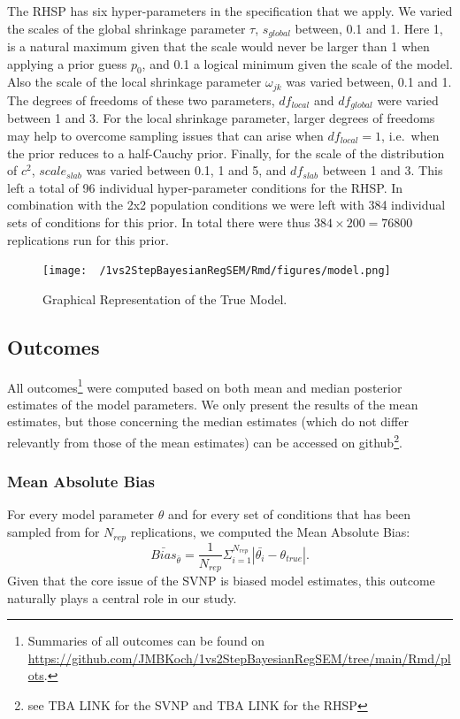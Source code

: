 \documentclass[
  man, donotrepeattitle,floatsintext]{apa6}
\begin{document}
The RHSP has six hyper-parameters in the specification that we apply. We varied the scales of the global shrinkage parameter \(\tau\), \(s_{global}\) between, 0.1 and 1. Here 1, is a natural maximum given that the scale would never be larger than 1 when applying a prior guess \(p_0\), and 0.1 a logical minimum given the scale of the model. Also the scale of the local shrinkage parameter \(\omega_{jk}\) was varied between, 0.1 and 1. The degrees of freedoms of these two parameters, \(df_{local}\) and \(df_{global}\) were varied between 1 and 3. For the local shrinkage parameter, larger degrees of freedoms may help to overcome sampling issues that can arise when \(df_{local} = 1\), i.e.~when the prior reduces to a half-Cauchy prior. Finally, for the scale of the distribution of \(c^2\), \(scale_{slab}\) was varied between 0.1, 1 and 5, and \(df_{slab}\) between 1 and 3. This left a total of 96 individual hyper-parameter conditions for the RHSP. In combination with the 2x2 population conditions we were left with 384 individual sets of conditions for this prior. In total there were thus \(384 \times 200 = 76800\) replications run for this prior.

\begin{figure}
\centering
\texttt{[image: ~/1vs2StepBayesianRegSEM/Rmd/figures/model.png]}
\caption{Graphical Representation of the True Model.}
\end{figure}

\hypertarget{outcomes}{%
\subsection{Outcomes}\label{outcomes}}

All outcomes\footnote{Summaries of all outcomes can be found on \url{https://github.com/JMBKoch/1vs2StepBayesianRegSEM/tree/main/Rmd/plots}.} were computed based on both mean and median posterior estimates of the model parameters. We only present the results of the mean estimates, but those concerning the median estimates (which do not differ relevantly from those of the mean estimates) can be accessed on github\footnote{see TBA LINK for the SVNP and TBA LINK for the RHSP}.

\hypertarget{mean-absolute-bias}{%
\subsubsection{Mean Absolute Bias}\label{mean-absolute-bias}}

For every model parameter \(\theta\) and for every set of conditions that has been sampled from for \(N_{rep}\) replications, we computed the Mean Absolute Bias:
\[\bar{Bias}_{\bar{\theta}} = \frac{1}{N_{rep}} \Sigma_{i = 1}^{N_{rep}} |\bar{\theta_i} - \theta_{true}|.\]
Given that the core issue of the SVNP is biased model estimates, this outcome naturally plays a central role in our study.
\end{document}
